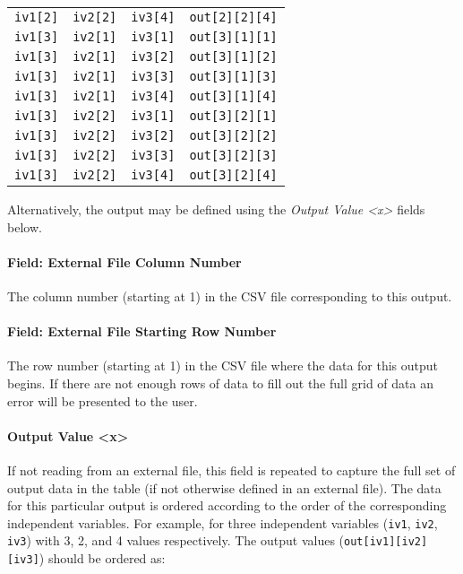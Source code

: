 \begin{longtable}[]{@{}llll@{}}
\texttt{iv1{[}2{]}} & \texttt{iv2{[}2{]}} & \texttt{iv3{[}4{]}} &
\texttt{out{[}2{]}{[}2{]}{[}4{]}}\tabularnewline
\texttt{iv1{[}3{]}} & \texttt{iv2{[}1{]}} & \texttt{iv3{[}1{]}} &
\texttt{out{[}3{]}{[}1{]}{[}1{]}}\tabularnewline
\texttt{iv1{[}3{]}} & \texttt{iv2{[}1{]}} & \texttt{iv3{[}2{]}} &
\texttt{out{[}3{]}{[}1{]}{[}2{]}}\tabularnewline
\texttt{iv1{[}3{]}} & \texttt{iv2{[}1{]}} & \texttt{iv3{[}3{]}} &
\texttt{out{[}3{]}{[}1{]}{[}3{]}}\tabularnewline
\texttt{iv1{[}3{]}} & \texttt{iv2{[}1{]}} & \texttt{iv3{[}4{]}} &
\texttt{out{[}3{]}{[}1{]}{[}4{]}}\tabularnewline
\texttt{iv1{[}3{]}} & \texttt{iv2{[}2{]}} & \texttt{iv3{[}1{]}} &
\texttt{out{[}3{]}{[}2{]}{[}1{]}}\tabularnewline
\texttt{iv1{[}3{]}} & \texttt{iv2{[}2{]}} & \texttt{iv3{[}2{]}} &
\texttt{out{[}3{]}{[}2{]}{[}2{]}}\tabularnewline
\texttt{iv1{[}3{]}} & \texttt{iv2{[}2{]}} & \texttt{iv3{[}3{]}} &
\texttt{out{[}3{]}{[}2{]}{[}3{]}}\tabularnewline
\texttt{iv1{[}3{]}} & \texttt{iv2{[}2{]}} & \texttt{iv3{[}4{]}} &
\texttt{out{[}3{]}{[}2{]}{[}4{]}}\tabularnewline
\bottomrule
\end{longtable}

Alternatively, the output may be defined using the \emph{Output Value
\textless{}x\textgreater{}} fields below.

\paragraph{Field: External File Column
Number}\label{field-external-file-column-number}

The column number (starting at 1) in the CSV file corresponding to this
output.

\paragraph{Field: External File Starting Row
Number}\label{field-external-file-starting-row-number}

The row number (starting at 1) in the CSV file where the data for this
output begins. If there are not enough rows of data to fill out the full
grid of data an error will be presented to the user.

\paragraph{Output Value
\textless{}x\textgreater{}}\label{output-value-x}

If not reading from an external file, this field is repeated to capture
the full set of output data in the table (if not otherwise defined in an
external file). The data for this particular output is ordered according
to the order of the corresponding independent variables. For example,
for three independent variables (\texttt{iv1}, \texttt{iv2},
\texttt{iv3}) with 3, 2, and 4 values respectively. The output values
(\texttt{out{[}iv1{]}{[}iv2{]}{[}iv3{]}}) should be ordered as:

